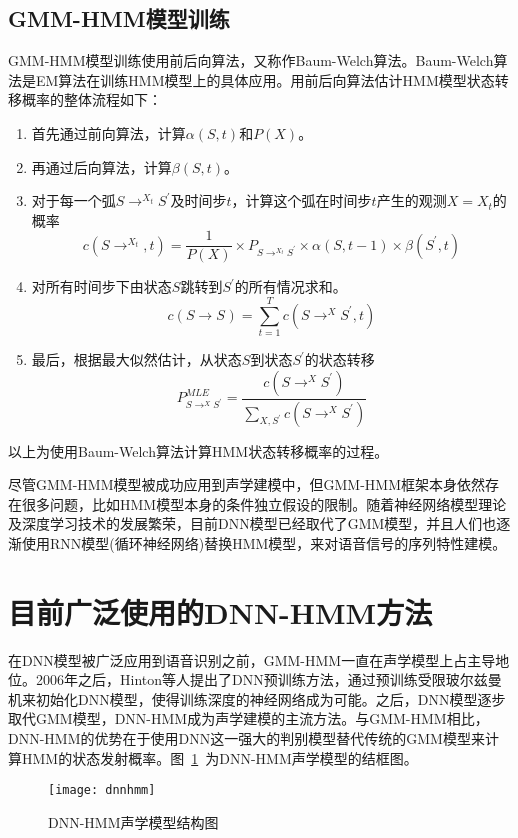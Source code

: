 \subsection{GMM-HMM模型训练}
GMM-HMM模型训练使用前后向算法，又称作Baum-Welch算法。Baum-Welch算法是EM算法在训练HMM模型上的具体应用。用前后向算法估计HMM模型状态转移概率的整体流程如下：
\begin{enumerate}
  \item 首先通过前向算法，计算$\alpha(S,t)$和$P(X)$。
  \item 再通过后向算法，计算$\beta(S,t)$。
  \item 对于每一个弧$S\rightarrow^{X_t}S^{'}$及时间步$t$，计算这个弧在时间步$t$产生的观测$X=X_t$的概率\begin{equation}c(S\rightarrow^{X_t},t)=\frac{1}{P(X)}\times P_{S\rightarrow^{X_t}S^{'}}\times \alpha(S,t-1) \times \beta(S^{'},t)\end{equation}
  \item 对所有时间步下由状态$S$跳转到$S^{'}$的所有情况求和。\begin{equation}c(S\rightarrow S^{})=\sum_{t=1}^T c(S\rightarrow^X S^{'},t)\end{equation}
  \item 最后，根据最大似然估计，从状态$S$到状态$S^{'}$的状态转移\begin{equation}P_{S\rightarrow^X S^{'}}^{MLE}=\frac{c(S\rightarrow^X S^{'})}{\sum_{X,S^{'}} c(S\rightarrow^X S^{'})}\end{equation}
\end{enumerate}
以上为使用Baum-Welch算法计算HMM状态转移概率的过程。

尽管GMM-HMM模型被成功应用到声学建模中，但GMM-HMM框架本身依然存在很多问题，比如HMM模型本身的条件独立假设的限制。随着神经网络模型理论及深度学习技术的发展繁荣，目前DNN模型已经取代了GMM模型，并且人们也逐渐使用RNN模型(循环神经网络)替换HMM模型，来对语音信号的序列特性建模。
\section{目前广泛使用的DNN-HMM方法}
在DNN模型被广泛应用到语音识别之前，GMM-HMM一直在声学模型上占主导地位。2006年之后，Hinton等人提出了DNN预训练方法，通过预训练受限玻尔兹曼机来初始化DNN模型，使得训练深度的神经网络成为可能。之后，DNN模型逐步取代GMM模型，DNN-HMM成为声学建模的主流方法。与GMM-HMM相比，DNN-HMM的优势在于使用DNN这一强大的判别模型替代传统的GMM模型来计算HMM的状态发射概率。图~\ref{fig:dnnhmm}~为DNN-HMM声学模型的结框图。
\begin{figure}[htbp]
\centering
\texttt{[image: dnnhmm]}
\caption{DNN-HMM声学模型结构图\cite{yu2012automatic}}\label{fig:dnnhmm}
\vspace{\baselineskip}
\end{figure}
